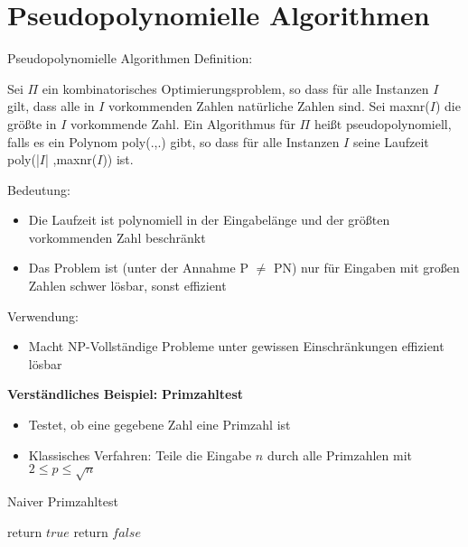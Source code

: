 \section{Pseudopolynomielle Algorithmen}

\begin{frame}{Pseudopolynomielle Algorithmen}
Definition:

Sei $\Pi$ ein kombinatorisches Optimierungsproblem, so dass für alle Instanzen $I$ gilt, dass alle in $I$ vorkommenden Zahlen natürliche Zahlen sind. Sei maxnr($I$) die größte in $I$ vorkommende Zahl. Ein Algorithmus für $\Pi$ heißt pseudopolynomiell, falls es ein Polynom poly(.,.)  gibt, so 
dass für alle Instanzen $I$ seine Laufzeit poly(|$I$| ,maxnr($I$)) ist. 

\end{frame}
\begin{frame}
Bedeutung:

\begin{itemize}
\item
Die Laufzeit ist polynomiell in der Eingabelänge und der größten vorkommenden Zahl beschränkt

\item
Das Problem ist (unter der Annahme P $\neq$ PN) nur für Eingaben mit großen Zahlen schwer lösbar, sonst effizient

\end{itemize}

Verwendung:
\begin{itemize}
\item
Macht NP-Vollständige Probleme unter gewissen Einschränkungen effizient lösbar

\end{itemize}
\end{frame}

\begin{frame}
\textbf{Verständliches Beispiel:}
\textbf{Primzahltest}

\begin{itemize}
\item
Testet, ob eine gegebene Zahl eine Primzahl ist
\item
Klassisches Verfahren: Teile die Eingabe $n$ durch alle Primzahlen mit $2 \leq p \leq \sqrt{n}$
\end{itemize}

\begin{algorithm}[H]
\caption{Naiver Primzahltest}
    \begin{algorithmic}
                  	\State return $true$
            \Else
                  	\State return $false$
            \EndIf
            \EndFor
        \EndFunction
    \end{algorithmic}
\end{algorithm}
\end{frame}

